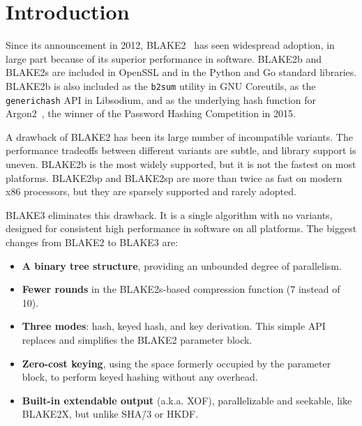 \documentclass[11pt,notitlepage,a4paper]{article}
\newcommand{\flag}[1]{\texttt{\detokenize{#1}}\xspace}
\begin{document}
\tableofcontents

\newpage

\section{Introduction}\label{sec:intro}

Since its announcement in 2012, BLAKE2~\cite{DBLP:conf/acns/AumassonNWW13} has
seen widespread adoption, in large part because of its superior performance in
software. BLAKE2b and BLAKE2s are included in OpenSSL and in the Python and Go
standard libraries. BLAKE2b is also included as the \texttt{b2sum} utility in
GNU Coreutils, as the \texttt{generichash} API in Libsodium, and as the
underlying hash function for Argon2~\cite{DBLP:conf/eurosp/BiryukovDK16}, the
winner of the Password Hashing Competition in 2015.

A drawback of BLAKE2 has been its large number of incompatible variants.
The performance tradeoffs between different variants are subtle, and
library support is uneven. BLAKE2b is the most widely supported, but it is not
the fastest on most platforms. BLAKE2bp and BLAKE2sp are more than twice as
fast on modern x86 processors, but they are sparsely supported and rarely
adopted.

BLAKE3 eliminates this drawback. It is a single algorithm with no variants,
designed for consistent high performance in software on all platforms. The
biggest changes from BLAKE2 to BLAKE3 are:

\begin{itemize}
    \item \textbf{A binary tree structure}, providing an unbounded
        degree of parallelism. 
    \item \textbf{Fewer rounds} in the BLAKE2s-based compression
    function (7 instead of 10).
    \item \textbf{Three modes}: hash, keyed hash, and
    key derivation.  This simple API replaces and simplifies the BLAKE2 parameter block.
    \item \textbf{Zero-cost keying}, using the space formerly occupied by the
        parameter block, to perform keyed hashing without any overhead.
    \item \textbf{Built-in extendable output} (a.k.a. XOF),
    parallelizable and seekable, like BLAKE2X, but unlike SHA\=/3 or
    HKDF.
\end{itemize}
\end{document}

